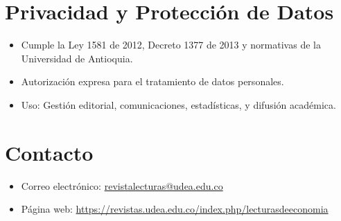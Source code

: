 \documentclass[12pt]{article}
\begin{document}
\section{Privacidad y Protección de Datos}
\begin{itemize}
  \item Cumple la Ley 1581 de 2012, Decreto 1377 de 2013 y normativas de la Universidad de Antioquia.
  \item Autorización expresa para el tratamiento de datos personales.
  \item Uso: Gestión editorial, comunicaciones, estadísticas, y difusión académica.
\end{itemize}

\section{Contacto}
\begin{itemize}
  \item Correo electrónico: \href{mailto:revistalecturas@udea.edu.co}{revistalecturas@udea.edu.co}
  \item Página web: \url{https://revistas.udea.edu.co/index.php/lecturasdeeconomia}
\end{itemize}
\end{document}
